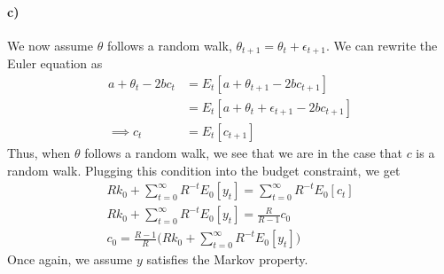 \documentclass[12pt,letter]{article}
\begin{document}
\paragraph{c)} We now assume $\theta$ follows a random walk, $\theta_{t+1} = \theta_t + \epsilon_{t+1}$. We can rewrite the Euler equation as
\begin{equation}
\begin{split}
	a + \theta_t - 2bc_t &= E_t\left[a + \theta_{t+1} - 2bc_{t+1}\right]\\
	&=  E_t\left[a + \theta_{t}+ \epsilon_{t+1} - 2bc_{t+1}\right]\\
	\implies c_t &=E_t\left[c_{t+1}\right]
\end{split}
\end{equation}
Thus, when $\theta$ follows a random walk, we see that we are in the case that $c$ is a random walk. Plugging this condition into the budget constraint, we get
\begin{equation}
	\begin{split}
	Rk_0 + \sum_{t = 0}^{\infty}R^{-t}E_0\left[y_t\right] = \sum_{t = 0}^{\infty}R^{-t}E_0\left[c_t\right]\\
	Rk_0 + \sum_{t = 0}^{\infty}R^{-t}E_0\left[y_t\right] = \frac{R}{R-1}c_0\\
	c_0 = \frac{R-1}{R}\bigg(Rk_0 + \sum_{t = 0}^{\infty}R^{-t}E_0\left[y_t\right]\bigg)
	\end{split}
\end{equation}
Once again, we assume $y$ satisfies the Markov property.
\end{document}
